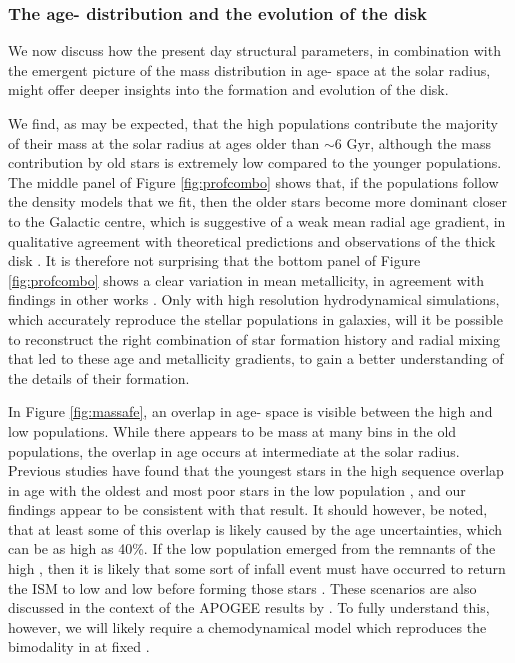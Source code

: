\subsubsection{The age-\feh{} distribution and the evolution of the disk}
We now discuss how the present day structural parameters, in combination with the emergent picture of the mass distribution in age-\feh{} space at the solar radius, might offer deeper insights into the formation and evolution of the disk. 

We find, as may be expected, that the high \afe{} populations contribute the majority of their mass at the solar radius at ages older than $\sim 6$ Gyr, although the mass contribution by old stars is extremely low compared to the younger populations. The middle panel of Figure \ref{fig:profcombo} shows that, if the populations follow the density models that we fit, then the older stars become more dominant closer to the Galactic centre, which is suggestive of a weak mean radial age gradient, in qualitative agreement with theoretical predictions \citep[e.g.][]{2015ApJ...804L...9M} and observations of the thick disk \citep[e.g.][]{2016arXiv160901168M}. It is therefore not surprising that the bottom panel of Figure \ref{fig:profcombo} shows a clear variation in mean metallicity, in agreement with findings in other works \citep[e.g.][]{2012ApJ...746..149C,2016arXiv160804951A,2015ApJ...808..132H}. Only with high resolution  hydrodynamical simulations, which accurately reproduce the stellar populations in galaxies, will it be possible to reconstruct the right combination of star formation history and radial mixing that led to these age and metallicity gradients, to gain a better understanding of the details of their formation.

In Figure \ref{fig:massafe}, an overlap in age-\feh{} space is visible between the high and low \afe{} populations. While there appears to be mass at many \feh{} bins in the old populations, the overlap in age occurs at intermediate \feh{} at the solar radius. Previous studies have found that the youngest stars in the high \afe{} sequence overlap in age with the oldest and most \feh{} poor stars in the low \afe{} population \citep[e.g.][]{2013A&A...560A.109H}, and our findings appear to be consistent with that result. It should however, be noted, that at least some of this overlap is likely caused by the age uncertainties, which can be as high as 40\%. If the low \afe{} population emerged from the remnants of the high \afe{}, then it is likely that some sort of infall event must have occurred to return the ISM to low \feh{} and low \afe{} before forming those stars \citep[as expressed by, e.g.,][]{1997ApJ...477..765C}. These scenarios are also discussed in the context of the APOGEE results by \citet{2014ApJ...796...38N}. To fully understand this, however, we will likely require a chemodynamical model which reproduces the bimodality in \afe{} at fixed \feh{}.

